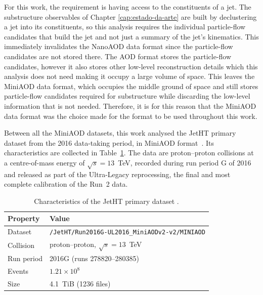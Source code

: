 For this work, the requirement is having access to the constituents of a jet. The substructure
observables of Chapter \ref{cap:estado-da-arte} are built by declustering a jet into its constituents,
so this analysis requires the individual particle-flow candidates that build the jet and not just 
a summary of the jet's kinematics. This immediately invalidates the NanoAOD data format since the particle-flow
candidates are not stored there. The AOD format stores the particle-flow candidates, however it also stores
other low-level reconstruction details which this analysis does not need making it occupy a large volume of
space. This leaves the MiniAOD data format, which occupies the middle ground of space and still
stores particle-flow candidates required for substructure while discarding the low-level information that is not
needed. Therefore, it is for this reason that the MiniAOD data format was the choice made for the format to be used
throughout this work.

Between all the MiniAOD datasets, this work analysed the JetHT primary dataset from the 2016 data-taking
period, in MiniAOD format~\cite{JetHT2016G}. Its characteristics are collected in
Table~\ref{tab:dataset}. The data are proton--proton collisions at a
centre-of-mass energy of $\sqrt{s} = 13$~TeV, recorded during run period G of 2016
and released as part of the Ultra-Legacy reprocessing, the final and most complete
calibration of the Run~2 data.

\begin{table}[htbp]
  \centering
  \caption{Characteristics of the JetHT primary dataset \cite{JetHT2016G}.}
  \label{tab:dataset}
  \begin{tabular}{ll}
    \toprule
    Property & Value \\
    \midrule
    Dataset & \texttt{/JetHT/Run2016G-UL2016\_MiniAODv2-v2/MINIAOD} \\
    Collision & proton--proton, $\sqrt{s} = 13$~TeV \\
    Run period & 2016G (runs 278820--280385) \\
    Events & $1.21 \times 10^{8}$ \\
    Size & 4.1~TiB (1236 files) \\
    \bottomrule
  \end{tabular}
\end{table}
  
